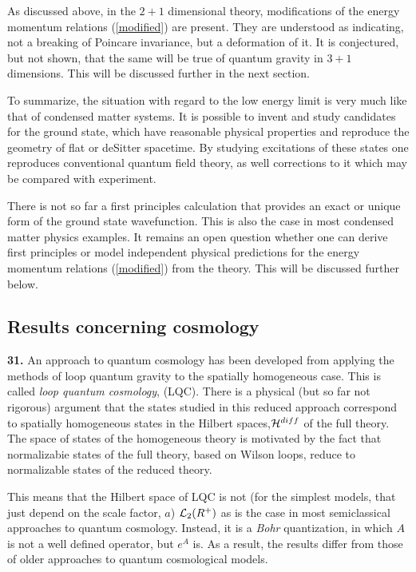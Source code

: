 \documentclass[12pt]{article}
\begin{document}
 As discussed above, in the $2+1$ dimensional theory, modifications of the energy
momentum relations (\ref{modified})  are present.  They are 
understood as indicating, not a breaking
of Poincare invariance, but a deformation of it\cite{dsr2+1}.   It is 
conjectured\cite{positive,GAL},
but not shown, that the same will be true of quantum gravity in $3+1$ dimensions.   This will be
discussed further in the next section.  
  
  To summarize, the situation with regard to the low energy limit is 
  very much like that of condensed matter systems. It is possible to 
invent and study candidates for the ground state, which have reasonable physical 
  properties and reproduce the geometry of flat or deSitter spacetime. 
  By studying excitations of these states one reproduces conventional 
  quantum field theory, as well corrections to it which may be compared 
  with experiment.  
  
 There is not so far a first principles calculation that 
  provides an exact or unique form of the ground state wavefunction.  This is 
  also the case in most condensed matter physics examples. It remains an open question whether one can derive first principles or model independent physical predictions for the energy momentum relations  (\ref{modified}) from the theory. 
This will be discussed further below.  
  
\subsection{Results concerning cosmology}
 
  {\bf 31.} An approach to quantum cosmology has been developed from applying
the methods of loop quantum gravity to the spatially homogeneous case\cite{LQC}. 
This is called {\it loop quantum cosmology}, (LQC).   
There is a physical (but so far not rigorous) argument that the states studied
in this reduced approach correspond to spatially homogeneous states in the Hilbert
spaces,${\cal H}^{diff}$ of the full theory.  The space of states of the homogeneous
theory is motivated by the fact that normalizabie states of the full theory, based on Wilson loops, reduce
to normalizable states of the reduced theory. 

This means that the Hilbert space of LQC is not (for the simplest models, that
just depend on the scale factor, $a$) ${\cal L}_2 (R^+)$ as
is the case in most semiclassical approaches to quantum cosmology.
Instead, it is a {\it Bohr} quantization, in which $A$ is not a well
defined operator, but $e^A$ is.  As a result, the results differ
from those of older approaches to quantum cosmological models.  
\end{document}
